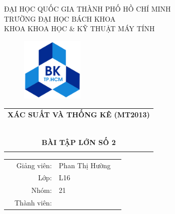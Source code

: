 \documentclass[a4paper]{article}
\theoremstyle{definition}
\begin{document}
\begin{titlepage}
\begin{center}
ĐẠI HỌC QUỐC GIA THÀNH PHỐ HỒ CHÍ MINH \\
TRƯỜNG ĐẠI HỌC BÁCH KHOA \\
KHOA KHOA HỌC \& KỸ THUẬT MÁY TÍNH 
\end{center}

\vspace{1cm}

\begin{figure}[h!]
\begin{center}
\includegraphics[width=3cm]{hcmut.png}
\end{center}
\end{figure}

\vspace{1cm}


\begin{center}
\centering
\begin{tabular}{c}
\multicolumn{1}{l}{\textbf{{\Large XÁC SUẤT VÀ THỐNG KÊ (MT2013)}}}\\
~~\\
\hline
\\
    \textbf{\Huge BÀI TẬP LỚN SỐ 2} \\
\\
\hline
\end{tabular}
\end{center}

\vspace{1.5cm}

\begin{table}[h]
\begin{tabular}{rrll}

\hspace{5 cm} & Giảng viên: &  Phan Thị Hường\\
& Lớp: & L16 \\
& Nhóm: & 21\\
& Thành viên:  


\end{tabular}
\end{table}
\end{titlepage}
\end{document}

